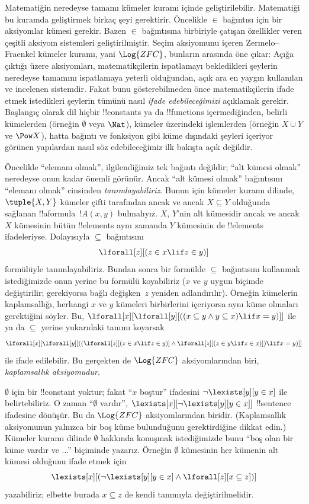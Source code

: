 \documentclass[../../../include/open-logic-section]{subfiles}
\begin{document}


Matematiğin neredeyse tamamı kümeler kuramı içinde geliştirilebilir.
Matematiği bu kuramda geliştirmek birkaç şeyi gerektirir. Öncelikle
$\in$ bağıntısı için bir aksiyomlar kümesi gerekir. Bazen $\in$
bağıntısına birbiriyle çatışan özellikler veren çeşitli aksiyom
sistemleri geliştirilmiştir. Seçim aksiyomunu içeren Zermelo--Fraenkel
kümeler kuramı, yani $\Log{ZFC}$, bunların arasında öne çıkar: Açığa
çıktığı üzere aksiyomları, matematikçilerin ispatlamayı bekledikleri
şeylerin neredeyse tamamını ispatlamaya yeterli olduğundan, açık ara en
yaygın kullanılan ve incelenen sistemdir. Fakat bunu gösterebilmeden
önce matematikçilerin ifade etmek istedikleri şeylerin tümünü nasıl
\emph{ifade edebileceğimizi} açıklamak gerekir. Başlangıç olarak dil
hiçbir !!{constant}s ya da !!{function}s içermediğinden, belirli
kümelerden (örneğin $\emptyset$ veya $\Nat$), kümeler üzerindeki
işlemlerden (örneğin $X\cup Y$ ve $\Pow X$), hatta bağıntı ve fonksiyon
gibi küme dışındaki şeyleri içeriyor görünen yapılardan nasıl söz
edebileceğimiz ilk bakışta açık değildir.

Öncelikle ``elemanı olmak'', ilgilendiğimiz tek bağıntı değildir;
``alt kümesi olmak'' neredeyse onun kadar önemli görünür. Ancak ``alt
kümesi olmak'' bağıntısını ``elemanı olmak'' cinsinden
\emph{tanımlayabiliriz}. Bunun için kümeler kuramı dilinde, $\tuple{X,Y}$
kümeler çifti tarafından ancak ve ancak $X\subseteq Y$ olduğunda
sağlanan !!a{formula}~$!A(x,y)$ bulmalıyız. $X$, $Y$'nin alt kümesidir
ancak ve ancak $X$ kümesinin bütün !!{element}s aynı zamanda $Y$
kümesinin de !!{element}s ifadeleriyse. Dolayısıyla $\subseteq$
bağıntısını
\[
\lforall[z][(z \in x \lif z \in y)]
\]
formülüyle tanımlayabiliriz. Bundan sonra bir formülde $\subseteq$
bağıntısını kullanmak istediğimizde onun yerine bu formülü koyabiliriz
($x$ ve $y$ uygun biçimde değiştirilir; gerekiyorsa bağlı değişken~$z$
yeniden adlandırılır). Örneğin kümelerin kaplamsallığı, herhangi $x$ ve
$y$ kümeleri birbirlerini içeriyorsa aynı küme olmaları gerektiğini
söyler. Bu,
$\lforall[x][\lforall[y][((x\subseteq y\land y\subseteq x)\lif x=y)]]$
ile ya da $\subseteq$ yerine yukarıdaki tanımı koyarsak
\[
\lforall[x][\lforall[y][((\lforall[z][(z \in x \lif z \in y)] \land
    \lforall[z][(z \in y \lif z \in x)]) \lif x = y)]]
\]
ile ifade edilebilir. Bu gerçekten de $\Log{ZFC}$ aksiyomlarından biri,
\emph{kaplamsallık aksiyomudur}.

$\emptyset$ için bir !!{constant} yoktur; fakat ``$x$ boştur'' ifadesini
$\lnot\lexists[y][y\in x]$ ile belirtebiliriz. O zaman ``$\emptyset$
vardır'', $\lexists[x][\lnot\lexists[y][y\in x]]$ !!{sentence}
ifadesine dönüşür. Bu da $\Log{ZFC}$ aksiyomlarından biridir.
(Kaplamsallık aksiyomunun yalnızca bir boş küme bulunduğunu gerektirdiğine
dikkat edin.) Kümeler kuramı dilinde $\emptyset$ hakkında konuşmak
istediğimizde bunu ``boş olan bir küme vardır ve ...'' biçiminde
yazarız. Örneğin $\emptyset$ kümesinin her kümenin alt kümesi olduğunu
ifade etmek için
\[
\lexists[x][(\lnot\lexists[y][y \in x] \land \lforall[z][x \subseteq z])]
\]
yazabiliriz; elbette burada $x\subseteq z$ de kendi tanımıyla
değiştirilmelidir.
\end{document}
